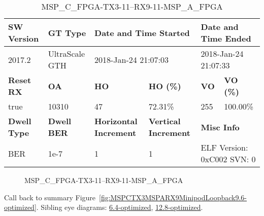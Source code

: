 \begin{table}[h]
\centering
\caption{MSP\_C\_FPGA-TX3-11--RX9-11-MSP\_A\_FPGA}
\label{tab:MSPCFPGATX311RX911MSPAFPGA9.6-optimized}
\begin{tabular}{@{}|l|l|l|l|l|l|@{}}
\toprule
\textbf{SW Version}                & \textbf{GT Type}   & \multicolumn{2}{l|}{\textbf{Date and Time Started}}            & \multicolumn{2}{l|}{\textbf{Date and Time Ended}}        \\ \midrule
2017.2                       & UltraScale GTH          & \multicolumn{2}{l|}{2018-Jan-24 21:07:03}                   & \multicolumn{2}{l|}{2018-Jan-24 21:07:33}               \\ \midrule
\textbf{Reset RX}                  & \textbf{OA} & \textbf{HO}   & \textbf{HO (\%)} & \textbf{VO} & \textbf{VO (\%)} \\ \midrule
true & 10310        & 47          & 72.31\%        & 255        & 100.00\%       \\ \midrule
\textbf{Dwell Type}                & \textbf{Dwell BER} & \textbf{Horizontal Increment} & \textbf{Vertical Increment}    & \multicolumn{2}{l|}{\textbf{Misc Info}}                  \\ \midrule
BER                            & 1e-7        & 1        & 1           & \multicolumn{2}{l|}{ELF Version: 0xC002 SVN: 0}                         \\ \bottomrule
\end{tabular}
\end{table}

\begin{figure}[h]
\caption{MSP\_C\_FPGA-TX3-11--RX9-11-MSP\_A\_FPGA} \label{fig:MSPCFPGATX311RX911MSPAFPGA9.6-optimized}
\end{figure}

Call back to summary Figure~\ref{fig:MSPCTX3MSPARX9MinipodLoopback9.6-optimized}.
Sibling eye diagrams: \hyperref[sec:MSPCFPGATX311RX911MSPAFPGA6.4-optimized]{6.4-optimized}, \hyperref[sec:MSPCFPGATX311RX911MSPAFPGA12.8-optimized]{12.8-optimized}.

\clearpage
\newpage

